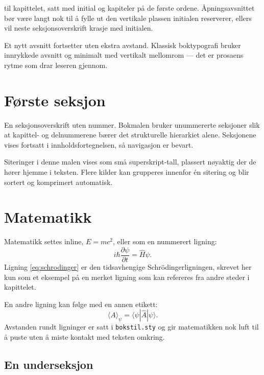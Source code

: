 
til kapittelet, satt med initial og kapiteler på de første
ordene. Åpningsavsnittet bør være langt nok til å fylle ut
den vertikale plassen initialen reserverer, ellers vil neste
seksjonsoverskrift krasje med initialen.

Et nytt avsnitt fortsetter uten ekstra avstand. Klassisk
boktypografi bruker innrykkede avsnitt og minimalt med
vertikalt mellomrom --- det er prosaens rytme som drar
leseren gjennom.


\section{Første seksjon}

En seksjonsoverskrift uten nummer. Bokmalen bruker
unummererte seksjoner slik at kapittel- og delnummerene
bærer det strukturelle hierarkiet alene. Seksjonene vises
fortsatt i innholdsfortegnelsen, så navigasjon er bevart.

Siteringer i denne malen vises som små superskript-tall,
plassert nøyaktig der de hører hjemme i teksten\cite{example-article}.
Flere kilder kan grupperes innenfor én sitering og blir
sortert og komprimert automatisk\cite{example-article,example-book}.


\section{Matematikk}

Matematikk settes inline, $E = mc^2$, eller som en
nummerert ligning:
\begin{equation}
  i\hbar \frac{\partial \psi}{\partial t}
  = \hat{H}\psi.
  \label{eq:schrodinger}
\end{equation}
Ligning \eqref{eq:schrodinger} er den tidsavhengige
Schr\"odingerligningen, skrevet her kun som et eksempel
på en merket ligning som kan refereres fra andre steder
i kapittelet.

En andre ligning kan følge med en annen etikett:
\begin{equation}
  \langle A \rangle_\psi = \langle \psi | \hat{A} | \psi \rangle.
  \label{eq:forventning}
\end{equation}
Avstanden rundt ligninger er satt i \texttt{bokstil.sty}
og gir matematikken nok luft til å puste uten å miste
kontakt med teksten omkring.

\subsection{En underseksjon}

